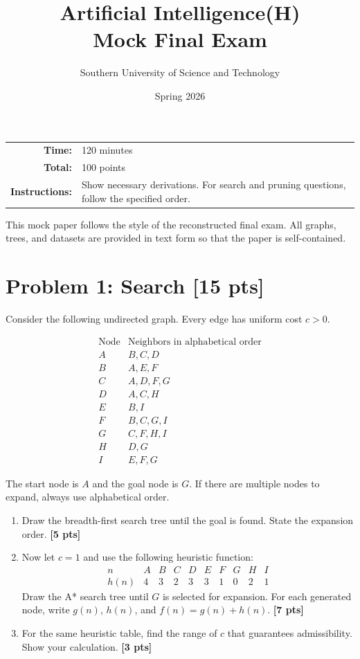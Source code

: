 \documentclass[UTF8,11pt,a4paper]{ctexart}
\title{\textbf{Artificial Intelligence(H)}\\
\large Mock Final Exam}
\author{Southern University of Science and Technology}
\date{Spring 2026}
\newcommand{\pts}[1]{\hfill{\bfseries [#1 pts]}}
\begin{document}
\maketitle

\begin{center}
\begin{tabular}{>{\bfseries}r p{}}
Time: & 120 minutes \\
Total: & 100 points \\
Instructions: & Show necessary derivations. For search and pruning questions, follow the specified order.
\end{tabular}
\end{center}

\vspace{0.5em}
This mock paper follows the style of the reconstructed final exam. All graphs, trees, and datasets are provided in text form so that the paper is self-contained.

\section*{Problem 1: Search \pts{15}}

Consider the following undirected graph. Every edge has uniform cost $c>0$.

\[
\begin{array}{c|l}
\text{Node} & \text{Neighbors in alphabetical order}\\
\hline
A & B,C,D\\
B & A,E,F\\
C & A,D,F,G\\
D & A,C,H\\
E & B,I\\
F & B,C,G,I\\
G & C,F,H,I\\
H & D,G\\
I & E,F,G
\end{array}
\]

The start node is $A$ and the goal node is $G$. If there are multiple nodes to expand, always use alphabetical order.

\begin{enumerate}[label=(\alph*)]
\item Draw the breadth-first search tree until the goal is found. State the expansion order. \pts{5}
\item Now let $c=1$ and use the following heuristic function:
\[
\begin{array}{c|ccccccccc}
n&A&B&C&D&E&F&G&H&I\\
\hline
h(n)&4&3&2&3&3&1&0&2&1
\end{array}
\]
Draw the A* search tree until $G$ is selected for expansion. For each generated node, write $g(n)$, $h(n)$, and $f(n)=g(n)+h(n)$. \pts{7}
\item For the same heuristic table, find the range of $c$ that guarantees admissibility. Show your calculation. \pts{3}
\end{enumerate}
\end{document}
